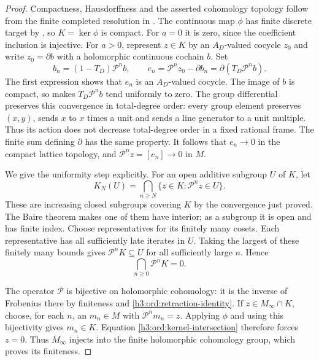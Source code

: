 \begin{proof}
Compactness, Hausdorffness and the asserted cohomology topology follow
from the finite completed resolution in .
The continuous map $\phi$ has finite discrete target by
, so $K=\ker\phi$ is compact.
For $a=0$ it is zero, since the coefficient inclusion is injective.
For $a>0$, represent $z\in K$ by an $A_D$-valued cocycle $z_0$
and write $z_0=\partial b$ with a holomorphic continuous cochain $b$.
Set
\[
 b_n=(1-T_D)\mathcal P^nb,\qquad
 e_n=\mathcal P^nz_0-\partial b_n
      =\partial(T_D\mathcal P^nb).
\]
The first expression shows that $e_n$ is an $A_D$-valued cocycle.
The image of $b$ is compact, so  makes
$T_D\mathcal P^nb$ tend uniformly to zero.
The group differential preserves this convergence in total-degree
order: every group element preserves $(x,y)$, sends $x$ to $x$ times
a unit and sends a line generator to a unit multiple.  Thus its
action does not decrease total-degree order in a fixed rational
frame.  The finite sum defining $\partial$ has the same property.
It follows that $e_n\to0$ in the compact lattice topology, and
$\mathcal P^nz=[e_n]\to0$ in $M$.

We give the uniformity step explicitly.  For an open additive subgroup
$U$ of $K$, let
\[
 K_N(U)=\bigcap_{n\geq N}\{z\in K:\mathcal P^nz\in U\}.
\]
These are increasing closed subgroups covering $K$ by the convergence
just proved.  The Baire theorem makes one of them have interior; as a
subgroup it is open and has finite index.  Choose representatives for
its finitely many cosets.  Each representative has all sufficiently
late iterates in $U$.  Taking the largest of these finitely many
bounds gives $\mathcal P^nK\subseteq U$ for all sufficiently
large $n$.  Hence
\begin{equation}\label{h3:ord:kernel-intersection}
 \bigcap_{n\geq0}\mathcal P^nK=0.
\end{equation}

The operator $\mathcal P$ is bijective on holomorphic cohomology:
it is the inverse of Frobenius there by finiteness and
\eqref{h3:ord:retraction-identity}.
If $z\in M_\infty\cap K$, choose, for each $n$, an $m_n\in M$
with $\mathcal P^nm_n=z$.  Applying $\phi$ and using this
bijectivity gives $m_n\in K$.  Equation
\eqref{h3:ord:kernel-intersection} therefore forces $z=0$.
Thus $M_\infty$ injects into the finite holomorphic cohomology group,
which proves its finiteness.
\end{proof}


